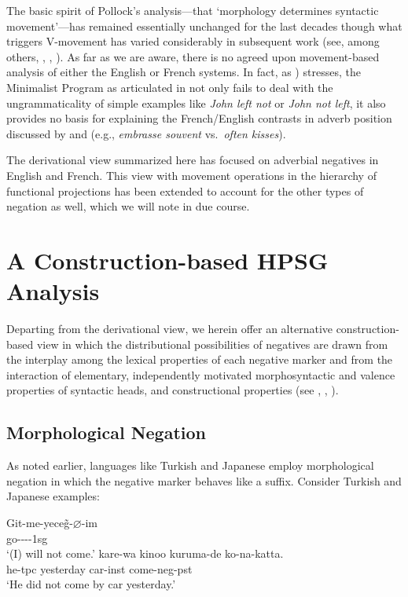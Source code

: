 \documentclass[output=paper]{langsci/langscibook}
\begin{document}
{The basic spirit of Pollock's analysis---that `morphology determines syntactic movement'---has
remained essentially unchanged for the last decades though what triggers V-movement has varied
considerably in subsequent work (see, among others, \citet{Zanuttini:01}, \citet{Bo:14},
\citet{Zeijlstra:15}).  As far as we are aware, there is no agreed upon movement-based analysis of
either the English or French systems. In fact, as \citet{Lasnik:00}) stresses, the Minimalist
Program as articulated in \citet{Chomsky:93,Chomsky:95,Chomsky:00} not only fails to deal with the
ungrammaticality of simple examples like {\it *John left not} or {\it *John not left}, it also
provides no basis for explaining the French/English contrasts in adverb position discussed by
\citet{Pollock:89} and \citet{Cinque:99} (e.g., {\it embrasse souvent} vs.\ {\it often
  kisses}).


The derivational view summarized here has focused on adverbial negatives
in English and French. This view with movement operations in the
 hierarchy of functional projections has been extended to account for the other types of negation as well, which we will note in due course.

\section{A Construction-based HPSG Analysis}

Departing from the derivational view, we
herein offer an alternative construction-based view in which the distributional possibilities of negatives
are drawn from the interplay among the lexical properties of each negative marker
and from the interaction of elementary, independently motivated
morphosyntactic and valence properties of syntactic heads, and constructional
properties (see \citet{Kim:00}, \citet{KS:02}, \citet{Crowgey:12}).


\subsection{Morphological Negation}

As noted earlier, languages like Turkish and Japanese employ morphological negation in which the negative marker behaves like a suffix. Consider
Turkish and Japanese examples:



\eal
\ex
\gll Git-me-yece\~{g}-$\varnothing$-im \\
    go-\NEG-\FUT-\COP-{\sc 1sg} \\
\glt `(I) will not come.'
\ex
\gll kare-wa kinoo kuruma-de ko-na-katta. \\
     he-{\sc tpc} yesterday car-{\sc inst} come-{\sc neg}-{\sc pst} \\
\glt `He did not come by car yesterday.'
\zl




}
\end{document}
